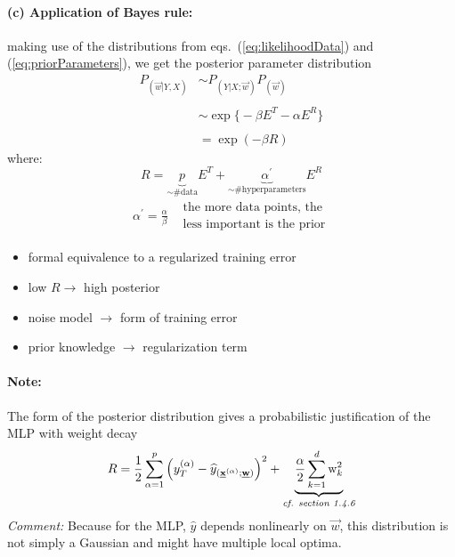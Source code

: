 \paragraph{(c) Application of Bayes rule:}
making use of the distributions from eqs.~(\ref{eq:likelihoodData}) and (\ref{eq:priorParameters}), we get the posterior parameter distribution
\begin{equation}
	\begin{array}{ll}
	P_{(\vec{w}|Y, X)}
	& \sim P_{(Y|X; \vec{w})} P_{(\vec{w})} \\\\
	& \sim \exp \big\{ -\beta E^T - \alpha E^R \big\} \\\\
	& = \exp(-\beta R)
	\end{array}	
\end{equation}
\indent where:
\begin{equation}
	R = \underbrace{ p }_{ \sim \# \text{data} } E^T
	+ \underbrace{ \alpha^{'} }_{ \sim \# \text{hyperparameters} }
	E^R
\end{equation}
\begin{equation}
	\begin{array}{lc}
	\alpha^{'} = \frac{\alpha}{\beta} 
	& \substack{	\text{the more data points, the} \\
			\text{less important is the prior}}
	\end{array}
\end{equation}
\begin{itemize}
	\item formal equivalence to a regularized training error
	\item low $R \rightarrow$ high posterior
	\item noise model $\rightarrow$ form of training error
	\item prior knowledge $\rightarrow$ regularization term
\end{itemize}


\paragraph{Note:} The form of the posterior distribution gives a
probabilistic justification of the MLP with weight decay
\begin{equation}
	R = \frac{1}{2} \sum\limits_{\alpha = 1}^p \Big( y_T^{(\alpha)}
		- \widehat{y}_{(\vec{x}^{(\alpha)}; \vec{w})} \Big)^2
		+ \underbrace{ \frac{ \alpha }{2} \sum\limits_{k = 1}^{d} 
			\mathrm{w}_k^2 }_{ \substack{ \text{{\it 
			cf. section 1.4.6}}} }
\end{equation}
\emph{Comment:} Because for the MLP, $\hat{y}$ depends nonlinearly on
$\vec{w}$, this distribution is not simply a Gaussian and might have
multiple local optima.

